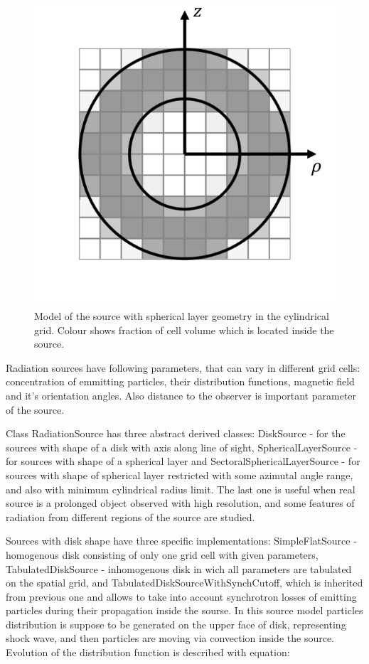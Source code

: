 \begin{figure}[h]
	\centering
	\includegraphics[width=10.5 cm]{./fig/sphericalSource.png} 
	\caption{Model of the source with spherical layer geometry in the cylindrical grid. Colour shows fraction of cell volume which is located inside the source.}
	\label{sphericalLayer}
\end{figure}

Radiation sources have following parameters, that can vary in different grid cells: concentration of emmitting particles, their distribution functions, magnetic field and it's orientation angles. Also distance to the observer is important parameter of the source.

Class RadiationSource has three abstract derived classes: DiskSource - for the sources with shape of a disk with axis along line of sight, SphericalLayerSource - for sources with shape of a spherical layer and SectoralSphericalLayerSource - for sources with shape of spherical layer restricted with some azimutal angle range, and also with minimum cylindrical radius limit. The last one is useful when real source is a prolonged object observed with high resolution, and some features of radiation from different regions of the source are studied.

Sources with disk shape have three specific implementations: SimpleFlatSource - homogenous disk consisting of only one grid cell with given parameters, TabulatedDiskSource - inhomogenous disk in wich all parameters are tabulated on the spatial grid, and TabulatedDiskSourceWithSynchCutoff, which is inherited from previous one and allows to take into account synchrotron losses of emitting particles during their propagation inside the sourse. In this source model particles distribution is suppose to be generated on the upper face of disk, representing shock wave, and then particles are moving via convection inside the source. Evolution of the distribution function is described with equation:

